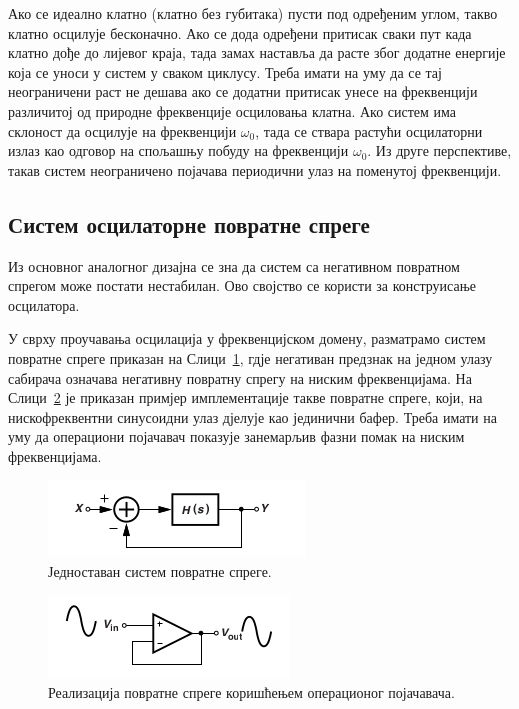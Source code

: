 \documentclass[master]{finthesis}
\begin{document}
Ако се идеално клатно (клатно без губитака) пусти под одређеним углом, такво клатно осцилује бесконачно. Ако се дода одређени притисак сваки пут када клатно дође до лијевог краја, тада замах наставља да расте због додатне енергије која се уноси у систем у сваком циклусу. Треба имати на уму да се тај неограничени раст не дешава ако се додатни притисак унесе на фреквенцији различитој од природне фреквенције осциловања клатна. Ако систем има склоност да осцилује на фреквенцији $\omega_{0}$, тада се ствара растући осцилаторни излаз као одговор на спољашњу побуду на фреквенцији $\omega_{0}$. Из друге перспективе, такав систем неограничено појачава периодични улаз на поменутој фреквенцији.

\subsection{Систем осцилаторне повратне спреге}
Из основног аналогног дизајна се зна да систем са негативном повратном спрегом може постати нестабилан. Ово својство се користи за конструисање осцилатора. \par
У сврху проучавања осцилација у фреквенцијском домену, разматрамо систем повратне спреге приказан на Слици~\ref{osc_feedback_1}, гдје негативан предзнак на једном улазу сабирача означава негативну повратну спрегу на ниским фреквенцијама. На Слици~\ref{osc_feedback_2} је приказан примјер имплементације такве повратне спреге, који, на нискофреквентни синусоидни улаз дјелује као јединични бафер. Треба имати на уму да операциони појачавач показује занемарљив фазни помак на ниским фреквенцијама. \par
\begin{figure}[!ht]
	 \centering
	 \includegraphics[scale=0.8]{slike/osc_feedback_1.png}
 	 \caption{Једноставан систем повратне спреге.}
	 \label{osc_feedback_1}
\end{figure}
\begin{figure}[!ht]
	 \centering
	 \includegraphics[scale=0.8]{slike/osc_feedback_2.png}
 	 \caption{Реализација повратне спреге коришћењем операционог појачавача.}
	 \label{osc_feedback_2}
\end{figure}
\end{document}
